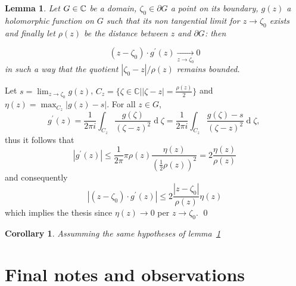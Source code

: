 \documentclass[a4paper,10pt]{article}
\newtheorem{cor}{Corollary}
\newtheorem{lemma}{Lemma}
\begin{document}
\begin{lemma}\label{lemma:main} Let $G\in\Bbb C$ be a domain, $\zeta_0 \in\partial G$ a point on its boundary, $g(z)$ a holomorphic function on $G$ such that its non tangential limit for $z \to\zeta_0$ exists and finally let $\rho(z)$ be the distance between $z$ and $\partial G$: then

$$
\left(z-\zeta_0\right) \cdot g^{\prime}(z) \underset{z \to \zeta_0}{\longrightarrow} 0
$$
in such a way that the quotient $\left|\zeta_0-z\right| / \rho(z)$ remains bounded.
\end{lemma}
\proof Let  $s=\lim _{z \to\zeta_0} g(z)$, $C_z=\big\{\zeta \in \mathbb{C}|| \zeta-z \mid=\frac{\rho(z)}{2}\big\}$ and $\eta(z)=\max _{{C}_z}|g(z)-s|$. For all $z \in G$,
$$
g^{\prime}(z)=\frac{1}{2 \pi i} \int_{C_z} \frac{g(\zeta)}{(\zeta-z)^2} \operatorname{d}\!\zeta=\frac{1}{2 \pi i} \int_{C_z}\frac{g(\zeta)-s}{(\zeta-z)^2} \operatorname{d}\! \zeta \text {, }
$$
thus it follows that
$$
\left|g^{\prime}(z)\right| \leqslant \frac{1}{2 \pi} \pi \rho(z) \frac{\eta(z)}{\left(\frac{1}{2} \rho(z)\right)^2}=2 \frac{\eta(z)}{\rho(z)}
$$
and consequently
$$
\left|\left(z-\zeta_0\right) \cdot g^{\prime}(z)\right| \leqslant 2 \frac{\left|z-\zeta_0\right|}{\rho(z)} \eta(z)
$$
which implies the thesis since $\eta(z) \to 0$ per $z \to \zeta_0$. \qed


\begin{cor}{\rm\cite[lemme II, p.~242]{Lojasiewicz1950}} Assumming the same hypotheses of lemma~\ref{lemma:main}
\end{cor}

\section{Final notes and observations}



\end{document}

